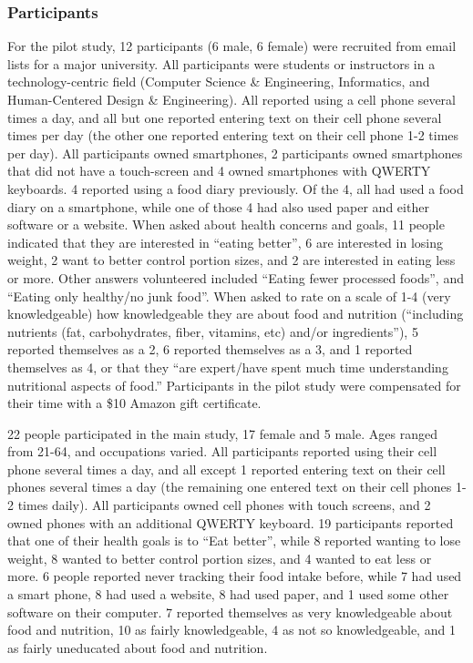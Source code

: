 \subsubsection{Participants}
For the pilot study, 12 participants (6 male, 6 female) were recruited from email lists for a major university. All participants were students or instructors in a technology-centric field (Computer Science \& Engineering, Informatics,  and Human-Centered Design \& Engineering).  All reported using a cell phone several times a day, and all but one reported entering text on their cell phone several times per day (the other one reported entering text on their cell phone 1-2 times per day). All participants owned smartphones, 2 participants owned smartphones that did not have a touch-screen and 4 owned smartphones with QWERTY keyboards. 4 reported using a food diary previously. Of the 4, all had used a food diary on a smartphone, while one of those 4 had also used paper and either software or a website. When asked about health concerns and goals, 11 people indicated that they are interested in ``eating better'', 6 are interested in losing weight, 2 want to better control portion sizes, and 2 are interested in eating less or more. Other answers volunteered included ``Eating fewer processed foods'', and ``Eating only healthy/no junk food''. When asked to rate on a scale of 1-4 (very knowledgeable) how knowledgeable they are about food and nutrition (``including nutrients (fat, carbohydrates, fiber, vitamins, etc) and/or ingredients''), 5 reported themselves as a 2, 6 reported themselves as a 3, and 1 reported themselves as 4, or that they ``are expert/have spent much time understanding nutritional aspects of food.'' Participants in the pilot study were compensated for their time with a \$10 Amazon gift certificate.

22 people participated in the main study, 17 female and 5 male. Ages ranged from 21-64, and occupations varied. All participants reported using their cell phone several times a day, and all except 1 reported entering text on their cell phones several times a day (the remaining one entered text on their cell phones 1-2 times daily). All participants owned cell phones with touch screens, and 2 owned phones with an additional QWERTY keyboard. 19 participants reported that one of their health goals is to ``Eat better'', while 8 reported wanting to lose weight, 8 wanted to better control portion sizes, and 4 wanted to eat less or more. 6 people reported never tracking their food intake before, while 7 had used a smart phone, 8 had used a website, 8 had used paper, and 1 used some other software on their computer. 7 reported themselves as very knowledgeable about food and nutrition, 10 as fairly knowledgeable, 4 as not so knowledgeable, and 1 as fairly uneducated about food and nutrition.  

